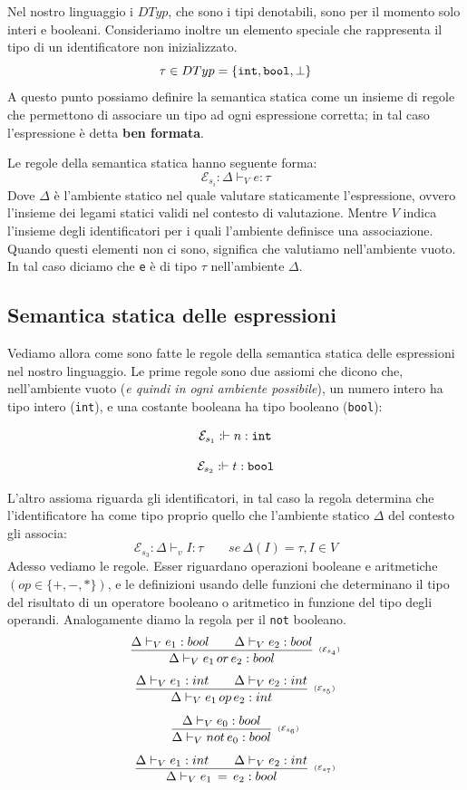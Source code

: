 \documentclass[oneside,a4paper,11pt]{book}
\theoremstyle{italicstyle}
\theoremstyle{normStyle}
\begin{document}
Nel nostro linguaggio i $DTyp$, che sono i tipi denotabili, sono per il momento solo interi e booleani.
Consideriamo inoltre un elemento speciale che rappresenta il tipo di un identificatore 
non inizializzato.
\[
  \tau \in DTyp = \{\verb|int|, \verb|bool|, \bot\}
\]
A questo punto possiamo definire la semantica statica come un insieme di regole che permettono 
di associare un tipo ad ogni espressione corretta;
in tal caso l'espressione è detta \textbf{ben formata}.

Le regole della semantica statica hanno seguente forma:
\[
  \mathcal{E}_{s_i}: \Delta \vdash_V e: \tau
\]
Dove $\Delta$ è l'ambiente statico nel quale valutare staticamente l'espressione, ovvero 
l'insieme dei legami statici validi nel contesto di valutazione. Mentre 
$V$ indica l'insieme degli identificatori per i quali l'ambiente definisce una 
associazione. Quando questi elementi non ci sono, significa che valutiamo nell'ambiente 
vuoto. In tal caso diciamo che \verb|e| è di tipo $\tau$ nell'ambiente $\Delta$.
\subsection{Semantica statica delle espressioni}
Vediamo allora come sono fatte le regole della semantica statica delle espressioni 
nel nostro linguaggio. Le prime regole sono due assiomi che dicono che, nell'ambiente 
vuoto (\textit{e quindi in ogni ambiente possibile}), un numero intero ha tipo intero (\verb|int|),
e una costante booleana ha tipo booleano (\verb|bool|):

\begin{minipage}[t]{0.45\textwidth}
\[
  \mathcal{E}_{s_1}: \vdash n: \verb|int|
\]
  
  \end{minipage}\hfill
  \begin{minipage}[t]{0.45\textwidth}
\[
  \mathcal{E}_{s_2}: \vdash t:\verb|bool|
\]
\end{minipage}  

L'altro assioma riguarda gli identificatori, in tal caso la regola determina 
che l'identificatore ha come tipo proprio 
quello che l'ambiente statico $\Delta$ del contesto gli associa:
\[
  \mathcal{E}_{s_3}: \Delta \vdash_v I: \tau \qquad se\,\Delta(I)=\tau,I\in V
\]
Adesso vediamo le regole. Esser riguardano operazioni booleane e aritmetiche $(op \in \{+,-,*\})$,
e le definizioni usando delle funzioni che determinano il tipo del risultato di un operatore
booleano o aritmetico in funzione del tipo degli operandi. Analogamente diamo la regola per il 
\verb|not| booleano.
\[
    \infer[\scriptscriptstyle (\mathcal{E}_{s_4})]
    {
      \Delta \vdash_V e_1 \, or \, e_2 : bool
    }
    {
      \Delta \vdash_V e_1 : bool \qquad \Delta \vdash_V e_2 : bool
    }
\]
\[
    \infer[\scriptscriptstyle (\mathcal{E}_{s_5})]
    {
      \Delta \vdash_V e_1 \, op \, e_2 : int
    }
    {
      \Delta \vdash_V e_1 : int \qquad \Delta \vdash_V e_2 : int
    }
\]
\[
    \infer[\scriptscriptstyle (\mathcal{E}_{s_6})]
    {
      \Delta \vdash_V not \,e_0 : bool
    }
    {
      \Delta \vdash_V e_0 : bool
    }
\]
\[
    \infer[\scriptscriptstyle (\mathcal{E}_{s_7})]
    {
      \Delta \vdash_V e_1 \, = \, e_2 : bool
    }
    {
      \Delta \vdash_V e_1 : int \qquad \Delta \vdash_V e_2 : int
    }
\]
\end{document}
